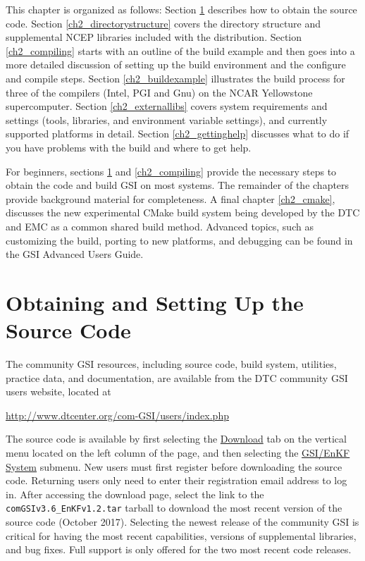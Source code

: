 This chapter is organized as follows: Section \ref{ch2_obtainingcode} describes how to obtain 
the source code. Section \ref{ch2_directorystructure} covers the directory structure and 
supplemental NCEP libraries included with the distribution. Section \ref{ch2_compiling} starts 
with an outline of the build example and then goes into a more detailed discussion of setting 
up the build environment and the configure and compile steps. 
Section \ref{ch2_buildexample} illustrates the build process for three of the compilers (Intel, 
PGI and Gnu) on the NCAR Yellowstone supercomputer. 
Section \ref{ch2_externallibs} covers system requirements and settings (tools, libraries, and environment 
variable settings), and currently supported platforms in detail. 
Section \ref{ch2_gettinghelp} discusses what to do if you have problems with the build and where to get help.

For beginners, sections \ref{ch2_obtainingcode} and \ref{ch2_compiling} provide the necessary 
steps to obtain the code and build GSI on most systems. The remainder of the chapters provide 
background material for completeness. A final chapter \ref{ch2_cmake}, discusses the new experimental CMake build system being developed by the DTC and EMC as a common shared build method.
 Advanced topics, such as customizing the build, porting to new platforms, and debugging can be 
found in the GSI Advanced User\textquotesingle s Guide.

\section{Obtaining and Setting Up the Source Code}  \label{ch2_obtainingcode}

The community GSI resources, including source code, build system, utilities, practice data, and 
documentation, are available from the DTC community GSI users website, located at

\url{http://www.dtcenter.org/com-GSI/users/index.php}

The source code is available by first selecting the \underline{Download} tab on the vertical 
menu located on the left column of the page, and then selecting the 
\underline{GSI/EnKF System} 
submenu. New users must first register before downloading the source code. Returning users 
only need to enter their registration email address to log in. After accessing the download page, 
select the link to the \verb|comGSIv3.6_EnKFv1.2.tar| tarball to download the most recent version 
of the source code (October 2017). Selecting the newest release of the community GSI is critical for 
having the most recent capabilities, versions of supplemental libraries, and bug fixes. Full support 
is only offered for the two most recent code releases.

